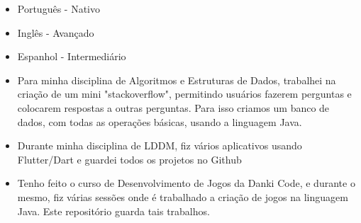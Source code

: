 \begin{itemize}
    \setlength\itemsep{1em}
    \item Português - Nativo 
    \item Inglês \hspace{16pt}- Avançado
    \item Espanhol \hspace{1pt} - Intermediário
\end{itemize}







\begin{itemize}
\item Para minha disciplina de Algoritmos e Estruturas de Dados, trabalhei na criação de um mini "stackoverflow", permitindo usuários fazerem perguntas e colocarem respostas a outras perguntas. Para isso criamos um banco de dados, com todas as operações básicas, usando a linguagem Java. 
\end{itemize}
\smallskip
{}
\begin{itemize}
\item Durante minha disciplina de LDDM, fiz vários aplicativos usando Flutter/Dart e guardei todos os projetos no Github
\end{itemize}
\smallskip
{}
\begin{itemize}
\item Tenho feito o curso de Desenvolvimento de Jogos da Danki Code, e durante o mesmo, fiz várias sessões onde é trabalhado a criação de jogos na linguagem Java. Este repositório guarda tais trabalhos. 
\end{itemize}
\smallskip

